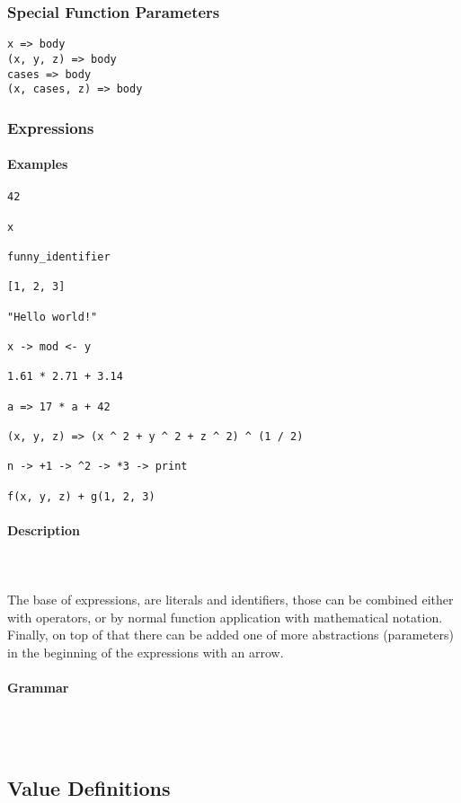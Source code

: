 \documentclass{article}
\def\pend{\mbox{} \\\\}
\begin{document}
\subsubsection{Special Function Parameters}

\begin{verbatim}
x => body
(x, y, z) => body
cases => body
(x, cases, z) => body
\end{verbatim}

\subsubsection{Expressions}

\paragraph{Examples}

\begin{verbatim}
42

x

funny_identifier 

[1, 2, 3]

"Hello world!"

x -> mod <- y

1.61 * 2.71 + 3.14

a => 17 * a + 42

(x, y, z) => (x ^ 2 + y ^ 2 + z ^ 2) ^ (1 / 2)

n -> +1 -> ^2 -> *3 -> print

f(x, y, z) + g(1, 2, 3)
\end{verbatim}

\paragraph{Description}\pend
The base of expressions, are literals and identifiers, those can be combined either
with operators, or by normal function application with mathematical notation. 
Finally, on top of that there can be added one of more abstractions (parameters)
in the beginning of the expressions with an arrow.

\paragraph{Grammar}\pend

\subsection{Value Definitions}
\label{subsec:valdefs}
\end{document}
